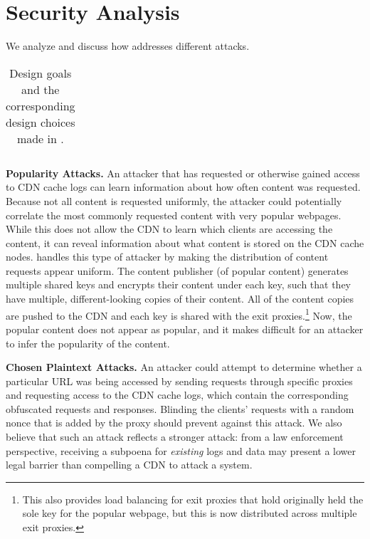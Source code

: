 \section{Security Analysis}
\label{sec:sec}
We analyze and discuss how \system{} addresses different attacks.

\begin{table*}[t!]
\centering
\begin{tabular}{| l | l | l | l | l |} 
 \hline

 \hline
\end{tabular}
\caption{Design goals and the corresponding design choices made in \system{}.}
\label{tab:design_goals}
\end{table*}

{\bf Popularity Attacks.}  An attacker that has requested or otherwise 
gained access to CDN cache logs can learn information about how often 
content was requested.  Because not all content is requested uniformly, the 
attacker could potentially correlate the most commonly requested content with 
very popular webpages.  While this does not allow the CDN to learn which 
clients are accessing the content, it can reveal information about what content 
is stored on the CDN cache nodes.  \system{} handles this type of attacker by making 
the distribution of content requests appear uniform.  The content publisher (of popular 
content) generates multiple shared keys 
and encrypts their content under each key, such that they have multiple, different-looking 
copies of their content.  All of the content copies are pushed to the CDN and each key is 
shared with the exit proxies.\footnote{This also provides load balancing for exit proxies 
that hold originally held the sole key for the popular webpage, but this is now distributed 
across multiple exit proxies.}  Now, the popular content does not appear as popular, 
and it makes difficult for an attacker to infer the popularity of the content.

{\bf Chosen Plaintext Attacks.} An attacker could attempt to
determine whether a particular URL was being accessed by sending requests
through specific \system{} proxies and requesting access to the CDN cache logs, 
which contain the corresponding obfuscated
requests and responses. Blinding the clients' requests
with a random nonce that is added by the proxy should prevent against this
attack. We also believe that such an attack reflects a stronger attack: from a
law enforcement perspective, receiving a subpoena for {\em existing} logs and
data may present a lower legal barrier than compelling a CDN to attack a
system.

